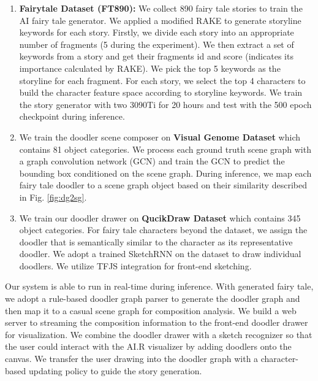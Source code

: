 \begin{enumerate}
    \item \textbf{Fairytale Dataset (FT890):} We collect 890 fairy tale stories to train the AI fairy tale generator. We applied a modified RAKE \cite{Rose2010} to generate storyline keywords for each story. Firstly, we divide each story into an appropriate number of fragments (5 during the experiment). We then extract a set of keywords from a story and get their fragments id and score (indicates its importance calculated by RAKE). We pick the top 5 keywords as the storyline for each fragment. For each story, we select the top 4 characters to build the character feature space according to storyline keywords. We train the story generator with two 3090Ti for 20 hours and test with the 500 epoch checkpoint during inference. \\
    
    \item We train the doodler scene composer on \textbf{Visual Genome Dataset} \cite{Krishna2017} which contains 81 object categories. We process each ground truth scene graph with a graph convolution network (GCN) and train the GCN to predict the bounding box conditioned on the scene graph. During inference, we map each fairy tale doodler to a scene graph object based on their similarity described in Fig. \ref{fig:dg2sg}. \\
    
    \item We train our doodler drawer on \textbf{QucikDraw Dataset}\cite{Ha2018ANR} which contains 345 object categories. For fairy tale characters beyond the dataset, we assign the doodler that is semantically similar to the character as its representative doodler. We adopt a trained  SketchRNN\cite{Ha2018ANR} on the dataset to draw individual doodlers. We utilize TFJS integration for front-end sketching.
\end{enumerate}

Our system is able to run in real-time during inference. With generated fairy tale, we adopt a rule-based doodler graph parser to generate the doodler graph and then map it to a casual scene graph for composition analysis. We build a web server to streaming the composition information to the front-end doodler drawer for visualization. We combine the doodler drawer with a sketch recognizer so that the user could interact with the AI.R visualizer by adding doodlers onto the canvas. We transfer the user drawing into the doodler graph with a character-based updating policy to guide the story generation.

